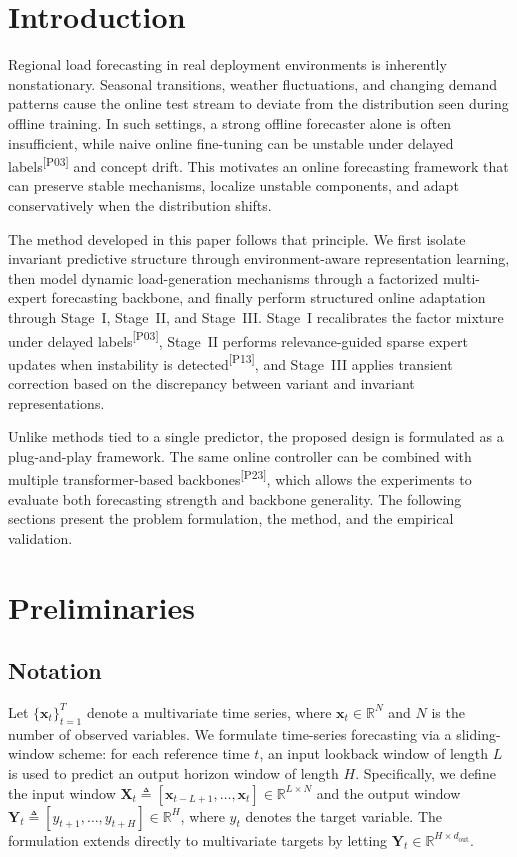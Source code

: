 ﻿\documentclass[journal]{IEEEtran}
\DeclareRobustCommand{\auditbad}[2]{{\color{auditred}#1}{\color{auditred}\textsuperscript{[#2]}}}
\begin{document}
\section{Introduction}
Regional load forecasting in real deployment environments is inherently nonstationary. Seasonal transitions, weather fluctuations, and changing demand patterns cause the online test stream to deviate from the distribution seen during offline training. In such settings, a strong offline forecaster alone is often insufficient, while naive online fine-tuning can be unstable under \auditbad{delayed labels}{P03} and concept drift. This motivates an online forecasting framework that can preserve stable mechanisms, localize unstable components, and adapt conservatively when the distribution shifts.

The method developed in this paper follows that principle. We first isolate invariant predictive structure through environment-aware representation learning, then model dynamic load-generation mechanisms through a factorized multi-expert forecasting backbone, and finally perform structured online adaptation through Stage~I, Stage~II, and Stage~III. Stage~I recalibrates the factor mixture under \auditbad{delayed labels}{P03}, Stage~II \auditbad{performs relevance-guided sparse expert updates when instability is detected}{P13}, and Stage~III applies transient correction based on the discrepancy between variant and invariant representations.

Unlike methods tied to a single predictor, the proposed design is formulated as a plug-and-play framework. The same online controller can be combined with \auditbad{multiple transformer-based backbones}{P23}, which allows the experiments to evaluate both forecasting strength and backbone generality. The following sections present the problem formulation, the method, and the empirical validation.

\section{Preliminaries}
\subsection{Notation}
Let $\{\mathbf{x}_t\}_{t=1}^{T}$ denote a multivariate time series, where $\mathbf{x}_t \in \mathbb{R}^{N}$ and $N$ is the number of observed variables. We formulate time-series forecasting via a sliding-window scheme: for each reference time $t$, an input lookback window of length $L$ is used to predict an output horizon window of length $H$. Specifically, we define the input window $\mathbf{X}_t \triangleq [\mathbf{x}_{t-L+1},\ldots,\mathbf{x}_t] \in \mathbb{R}^{L \times N}$ and the output window $\mathbf{Y}_t \triangleq [y_{t+1},\ldots,y_{t+H}] \in \mathbb{R}^{H}$, where $y_t$ denotes the target variable. The formulation extends directly to multivariate targets by letting $\mathbf{Y}_t \in \mathbb{R}^{H \times d_{\mathrm{out}}}$.
\end{document}
